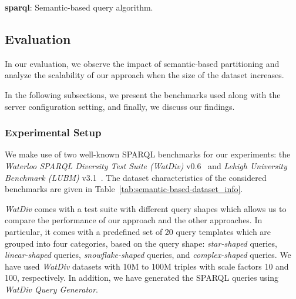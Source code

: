 \begin{algorithm*}
\caption{\textbf{sparql}: Semantic-based query algorithm.}
\label{alg:semantic-based-sparql}
\end{algorithm*}

\subsection{Evaluation}
\label{sec:semantic-based-evaluation}

In our evaluation, we observe the impact of semantic-based partitioning and analyze the scalability of our approach when the size of the dataset increases.

In the following subsections, we present the benchmarks used along with the server configuration setting, and finally, we discuss our findings.

\subsubsection{Experimental Setup}
We make use of two well-known \gls{SPARQL} benchmarks for our experiments: 
the \textit{Waterloo \gls{SPARQL} Diversity Test Suite (WatDiv)} v0.6~\cite{Alu2014DiversifiedST} and \textit{Lehigh University Benchmark (LUBM)} v3.1~\cite{Guo2005LUBMAB}.
The dataset characteristics of the considered benchmarks are given in Table~\ref{tab:semantic-based-dataset_info}.

\textit{WatDiv} comes with a test suite with different query shapes which allows us to compare the performance of our approach and the other approaches. 
In particular, it comes with a predefined set of 20 query templates which are grouped into four categories, based on the query shape: \textit{star-shaped} queries, \textit{linear-shaped} queries, \textit{snowflake-shaped} queries, and \textit{complex-shaped} queries.
We have used \textit{WatDiv} datasets with 10M to 100M triples with scale factors 10 and 100, respectively.
In addition, we have generated the \gls{SPARQL} queries using \textit{WatDiv Query Generator}.


